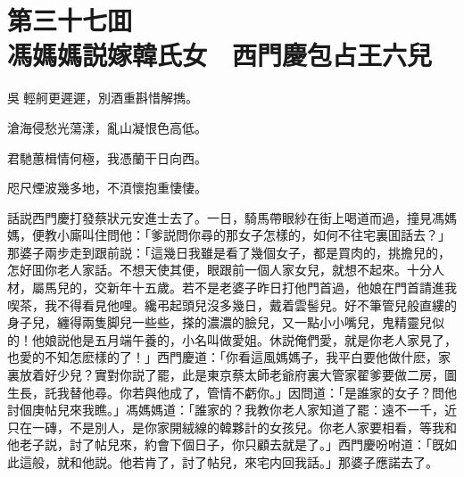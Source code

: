
\chapter*{第三十七囬　\\馮媽媽説嫁韓氏女　西門慶包占王六兒}


\begin{myquote}
吳𦨻輕舸更遲遲，別酒重斟惜解擕。

滄海侵愁光蕩漾，亂山凝恨色高低。

君馳蕙楫情何極，我憑蘭干日向西。

咫尺煙波幾多地，不湏懷抱重悽悽。
\end{myquote}

話説西門慶打發蔡狀元安進士去了。一日，騎馬帶眼紗在街上喝道而過，撞見馮媽媽，便教小廝叫住問他：「爹説問你尋的那女子怎樣的，如何不往宅裏囬話去？」那婆子兩步走到跟前説：「這幾日我雖是看了幾個女子，都是買肉的，挑擔兒的，怎好囬你老人家話。不想天使其便，眼跟前一個人家女兒，就想不起來。十分人材，屬馬兒的，交新年十五歲。若不是老婆子昨日打他門首過，他娘在門首請進我喫茶，我不得看見他哩。纔弔起頭兒沒多幾日，戴着雲髻兒。好不筆管兒般直縷的身子兒，纏得兩隻脚兒一些些，搽的濃濃的臉兒，又一點小小嘴兒，鬼精靈兒似的！他娘説他是五月端午養的，小名叫做愛姐。休説俺們愛，就是你老人家見了，也愛的不知怎麽樣的了！」西門慶道：「你看這風媽媽子，我平白要他做什麽，家裏放着好少兒？實對你説了罷，此是東京蔡太師老爺府裏大管家翟爹要做二房，圖生長，託我替他尋。你若與他成了，管情不虧你。」因問道：「是誰家的女子？問他討個庚帖兒來我瞧。」馮媽媽道：「誰家的？我教你老人家知道了罷：遠不一千，近只在一磚，不是別人，是你家開絨線的韓夥計的女孩兒。你老人家要相看，等我和他老子説，討了帖兒來，約會下個日子，你只顧去就是了。」西門慶吩咐道：「旣如此這般，就和他説。他若肯了，討了帖兒，來宅内回我話。」那婆子應諾去了。

